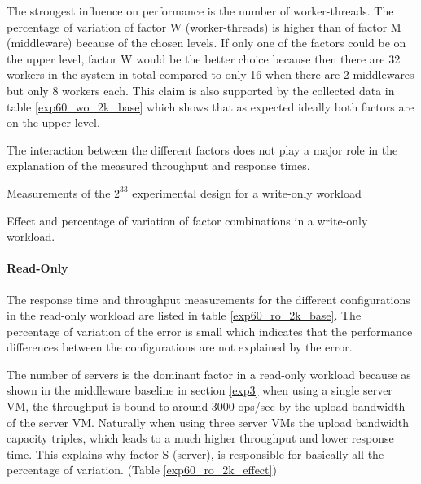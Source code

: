 \documentclass[report.tex]{subfiles}
\begin{document}
The strongest influence on performance is the number of worker-threads. 
The percentage of variation of factor W (worker-threads) is higher than of factor M (middleware) because of the chosen levels. If only one of the factors could be on the upper level, factor W would be the better choice 
because then there are 32 workers in the system in total compared to only 16 when there are 2 middlewares but only 8 workers each. This claim is also supported by the collected data in table \ref{exp60_wo_2k_base} which shows that as expected ideally both factors are on the upper level.

The interaction between the different factors does not play a major role in the explanation of the measured throughput and response times.	

\begin{table}[H]
	\centering
	\small{
		\setlength{\tabcolsep}{3.9pt}
		
		\caption{Measurements of the $2^33$ experimental design for a write-only workload}\label{exp60_wo_2k_base} 
	}
\end{table}


\begin{table}[H]
	\small{
		\centering	
		\setlength{\tabcolsep}{4.1pt}
		\newcommand{\rlft}[0]{\raggedleft\arraybackslash}
		
		\caption{Effect and percentage of variation of factor combinations in a write-only workload.}\label{exp60_wo_2k_effect}
	}
\end{table}



\paragraph{Read-Only}

The response time and throughput measurements for the different configurations in the read-only workload are listed in table \ref{exp60_ro_2k_base}. The percentage of variation of the error is small which indicates that the performance differences between the configurations are not explained by the error. 

The number of servers is the dominant factor in a read-only workload because as shown in the middleware baseline in section \ref{exp3} when using a single server VM, the throughput is bound to around 3000 ops/sec by the upload bandwidth of the server VM. Naturally when using three server VMs the upload bandwidth capacity triples, which leads to a much higher throughput and lower response time. This explains why factor S (server), is responsible for basically all the percentage of variation. (Table \ref{exp60_ro_2k_effect})
\end{document}
